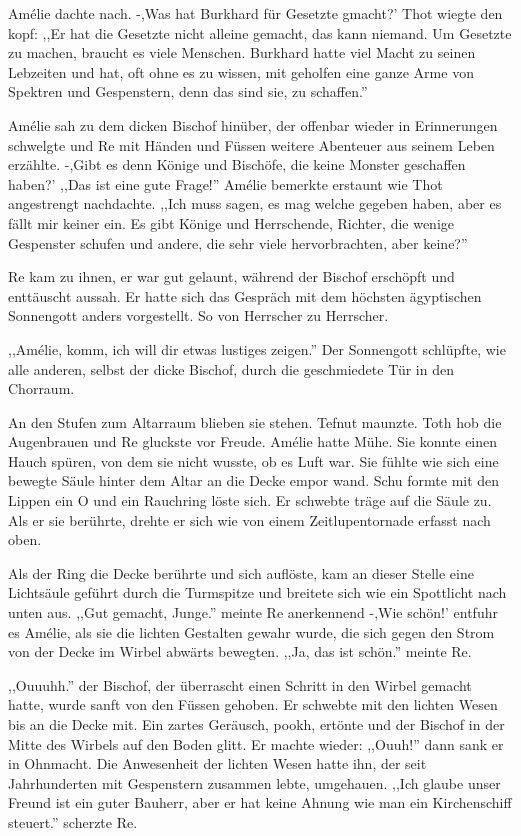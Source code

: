\documentclass[11pt,titlepage,a5paper]{book}
\begin{document}
Amélie dachte nach. -,Was hat Burkhard für Gesetzte gmacht?' Thot wiegte den kopf: ,,Er hat die Gesetzte nicht alleine gemacht, das kann niemand. Um Gesetzte zu machen, braucht es viele Menschen. Burkhard hatte viel Macht zu seinen Lebzeiten und hat, oft ohne es zu wissen, mit geholfen eine ganze Arme von Spektren und Gespenstern, denn das sind sie, zu schaffen.''

Amélie sah zu dem dicken Bischof hinüber, der offenbar wieder in Erinnerungen schwelgte und Re mit Händen und Füssen weitere Abenteuer aus seinem Leben erzählte. -,Gibt es denn Könige und Bischöfe, die keine Monster geschaffen haben?' ,,Das ist eine gute Frage!'' Amélie bemerkte erstaunt wie Thot angestrengt nachdachte. ,,Ich muss sagen, es mag welche gegeben haben, aber es fällt mir keiner ein. Es gibt Könige und Herrschende, Richter, die wenige Gespenster schufen und andere, die sehr viele hervorbrachten, aber keine?''

Re kam zu ihnen, er war gut gelaunt, während der Bischof erschöpft und enttäuscht aussah. Er hatte sich das Gespräch mit dem höchsten ägyptischen Sonnengott anders vorgestellt. So von Herrscher zu Herrscher. 

,,Amélie, komm, ich will dir etwas lustiges zeigen.'' Der Sonnengott schlüpfte, wie alle anderen, selbst der dicke Bischof, durch die geschmiedete Tür in den Chorraum.

An den Stufen zum Altarraum blieben sie stehen. Tefnut maunzte. Toth hob die Augenbrauen und Re gluckste vor Freude. Amélie hatte Mühe. Sie konnte einen Hauch spüren, von dem sie nicht wusste, ob es Luft war. Sie fühlte wie sich eine bewegte Säule hinter dem Altar an die Decke empor wand. Schu formte mit den Lippen ein O und ein Rauchring löste sich. Er schwebte träge auf die Säule zu. Als er sie berührte, drehte er sich wie von einem Zeitlupentornade erfasst nach oben. 

Als der Ring die Decke berührte und sich auflöste, kam an dieser Stelle eine Lichtsäule geführt durch die Turmspitze und breitete sich wie ein Spottlicht nach unten aus. ,,Gut gemacht, Junge.'' meinte Re anerkennend -,Wie schön!' entfuhr es Amélie, als sie die lichten Gestalten gewahr wurde, die sich gegen den Strom von der Decke im Wirbel abwärts bewegten. ,,Ja, das ist schön.'' meinte Re.

,,Ouuuhh.'' der Bischof, der überrascht einen Schritt in den Wirbel gemacht hatte, wurde sanft von den Füssen gehoben. Er schwebte mit den lichten Wesen bis an die Decke mit. Ein zartes Geräusch, pookh,  ertönte und der Bischof in der Mitte des Wirbels auf den Boden glitt. Er machte wieder: ,,Ouuh!'' dann sank er in Ohnmacht. Die Anwesenheit der lichten Wesen hatte ihn, der seit Jahrhunderten mit Gespenstern zusammen lebte, umgehauen. ,,Ich glaube unser Freund ist ein guter Bauherr, aber er hat keine Ahnung wie man ein Kirchenschiff steuert.'' scherzte Re.
\end{document}
